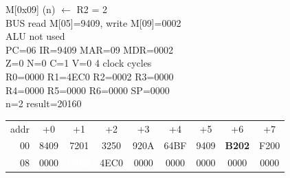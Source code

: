\begin{tcolorbox}[stepbox, title={Step 31 \hfill PC 05 \quad ST R2, n}]
M[0x09] (n) $\leftarrow$ R2 = 2\\
\textcolor{dim}{BUS} read M[05]=9409, \textcolor{wrt}{write M[09]=0002}\\
\textcolor{dim}{ALU} \textcolor{dim}{not used}\\
PC=06 IR=9409 MAR=09 MDR=0002\\
Z=0 N=0 C=1 V=0 \hfill \textcolor{dim}{4 clock cycles}\\
R0=0000 R1=4EC0 R2=0002 R3=0000\\
R4=0000 R5=0000 R6=0000 SP=0000\\
\textcolor{dim}{n=2  result=20160}\\[1pt]
{\setlength{\tabcolsep}{1.6pt}\begin{tabular}{@{}r*{8}{c}@{}}
\textcolor{dim}{addr} & \textcolor{dim}{+0} & \textcolor{dim}{+1} & \textcolor{dim}{+2} & \textcolor{dim}{+3} & \textcolor{dim}{+4} & \textcolor{dim}{+5} & \textcolor{dim}{+6} & \textcolor{dim}{+7}\\
\textcolor{dim}{00} & 8409 & 7201 & 3250 & 920A & 64BF & 9409 & \cellcolor{pcc}\textbf{B202} & F200\\
\textcolor{dim}{08} & 0000 & \cellcolor{wrt}\textcolor{white}{\textbf{0002}} & \cellcolor{datac}4EC0 & 0000 & 0000 & 0000 & 0000 & 0000\\
\end{tabular}}
\end{tcolorbox}\par\vspace{3pt}
